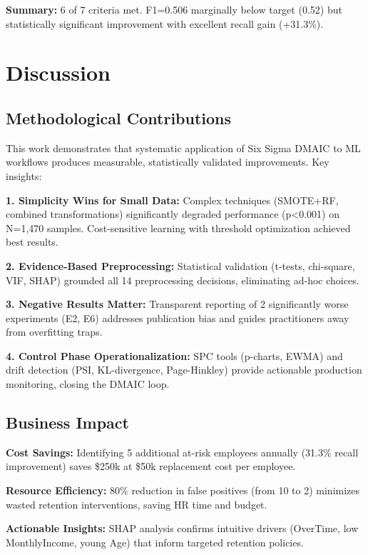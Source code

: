 \documentclass[conference]{IEEEtran}
\begin{document}
\textbf{Summary:} 6 of 7 criteria met. F1=0.506 marginally below target (0.52) but statistically significant improvement with excellent recall gain (+31.3\%).

\section{Discussion}

\subsection{Methodological Contributions}

This work demonstrates that systematic application of Six Sigma DMAIC to ML workflows produces measurable, statistically validated improvements. Key insights:

\textbf{1. Simplicity Wins for Small Data:} Complex techniques (SMOTE+RF, combined transformations) significantly degraded performance (p<0.001) on N=1,470 samples. Cost-sensitive learning with threshold optimization achieved best results.

\textbf{2. Evidence-Based Preprocessing:} Statistical validation (t-tests, chi-square, VIF, SHAP) grounded all 14 preprocessing decisions, eliminating ad-hoc choices.

\textbf{3. Negative Results Matter:} Transparent reporting of 2 significantly worse experiments (E2, E6) addresses publication bias and guides practitioners away from overfitting traps.

\textbf{4. Control Phase Operationalization:} SPC tools (p-charts, EWMA) and drift detection (PSI, KL-divergence, Page-Hinkley) provide actionable production monitoring, closing the DMAIC loop.

\subsection{Business Impact}

\textbf{Cost Savings:} Identifying 5 additional at-risk employees annually (31.3\% recall improvement) saves \$250k at \$50k replacement cost per employee.

\textbf{Resource Efficiency:} 80\% reduction in false positives (from 10 to 2) minimizes wasted retention interventions, saving HR time and budget.

\textbf{Actionable Insights:} SHAP analysis confirms intuitive drivers (OverTime, low MonthlyIncome, young Age) that inform targeted retention policies.
\end{document}
